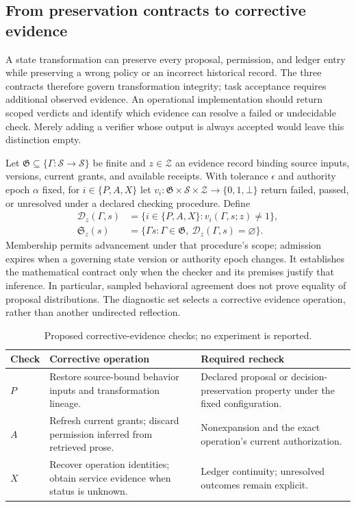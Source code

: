 \subsection{From preservation contracts to corrective evidence}
\label{sec:C01:operationalcontracts}
A state transformation can preserve every proposal, permission, and ledger entry while preserving a wrong policy or an incorrect historical record. The three contracts therefore govern transformation integrity; task acceptance requires additional observed evidence. An operational implementation should return scoped verdicts and identify which evidence can resolve a failed or undecidable check. Merely adding a verifier whose output is always accepted would leave this distinction empty.

Let $\mathfrak G\subseteq\{\Gamma:\mathcal S\to\mathcal S\}$ be finite and $z\in\mathcal Z$ an evidence record binding source inputs, versions, current grants, and available receipts. With tolerance $\epsilon$ and authority epoch $\alpha$ fixed, for $i\in\{P,A,X\}$ let $v_i:\mathfrak G\times\mathcal S\times\mathcal Z\to\{0,1,\bot\}$ return failed, passed, or unresolved under a declared checking procedure. Define
\begin{equation}
\label{eq:C01:diagnosticadmission}
\begin{aligned}
 \mathcal D_z(\Gamma,s)
   &=\{i\in\{P,A,X\}:v_i(\Gamma,s;z)\ne1\},\\
 \mathfrak S_z(s)
   &=\{\Gamma s:\Gamma\in\mathfrak G,\ \mathcal D_z(\Gamma,s)=\varnothing\}.
\end{aligned}
\end{equation}
Membership permits advancement under that procedure's scope; admission expires when a governing state version or authority epoch changes. It establishes the mathematical contract only when the checker and its premises justify that inference. In particular, sampled behavioral agreement does not prove equality of proposal distributions. The diagnostic set selects a corrective evidence operation, rather than another undirected reflection.

{\small\setlength{\tabcolsep}{3pt}
\begin{table}[!htbp]
\centering
\caption{Proposed corrective-evidence checks; no experiment is reported.}\label{tab:C01:corrective}
\begin{tabular}{L{16mm}L{45mm}L{51mm}}
\toprule Check & Corrective operation & Required recheck\\\midrule
$P$ & Restore source-bound behavior inputs and transformation lineage. & Declared proposal or decision-preservation property under the fixed configuration.\\
$A$ & Refresh current grants; discard permission inferred from retrieved prose. & Nonexpansion and the exact operation's current authorization.\\
$X$ & Recover operation identities; obtain service evidence when status is unknown. & Ledger continuity; unresolved outcomes remain explicit.\\
\bottomrule
\end{tabular}
\end{table}
}

